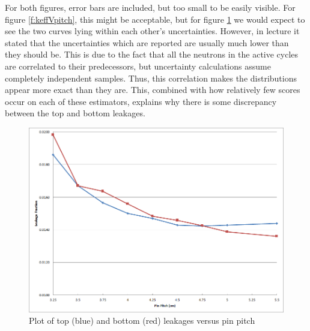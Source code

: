 For both figures, error bars are included, but too small to be easily visible.  For figure \ref{f:keffVpitch}, this might be acceptable, but for figure \ref{f:leakVpitch} we would expect to see the two curves lying within each other's uncertainties.  However, in lecture it stated that the uncertainties which are reported are usually much lower than they should be.  This is due to the fact that all the neutrons in the active cycles are correlated to their predecessors, but uncertainty calculations assume completely independent samples.  Thus, this correlation makes the distributions appear more exact than they are.  This, combined with how relatively few scores occur on each of these estimators, explains why there is some discrepancy between the top and bottom leakages.

\begin{figure}[H]
\centering
\includegraphics[width=0.8\linewidth]{images/leakage_v_pitch.png}
\caption{Plot of top (blue) and bottom (red) leakages versus pin pitch}
\label{f:leakVpitch}
\end{figure}